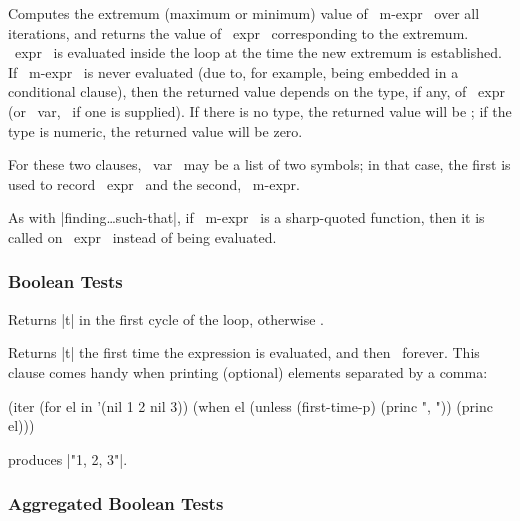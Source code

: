 \begin{clauses}
\startitem
{}
\finishitem
Computes the extremum (maximum or minimum) value of ~m-expr~ over all
iterations, and returns the value of ~expr~ corresponding to the
extremum.  ~expr~ is evaluated inside the loop at the time the new
extremum is established.  If ~m-expr~ is never evaluated (due to, for
example, being embedded in a conditional clause), then the returned
value depends on the type, if any, of ~expr~ (or ~var,~ if
one is supplied).  If there is no type, the returned
value will be \nil; if the type is numeric, the returned value will be
zero.

\cpar For these two clauses, ~var~ may be a list of two
symbols; in that case, the first is used to record ~expr~ and
the second, ~m-expr.~

\cpar As with |finding\dots such-that|, if ~m-expr~ is a sharp-quoted
function, then it is called on ~expr~ instead of being evaluated.

\end{clauses}

\subsubsection{Boolean Tests}

\begin{clauses}

Returns |t| in the first cycle of the loop, otherwise \nil.

Returns |t| the first time the expression is evaluated, and then \nil\ forever.
This clause comes handy when printing (optional) elements separated
by a comma:

\begin{program}
(iter (for el in '(nil 1 2 nil 3))
      (when el
        (unless (first-time-p)
          (princ ", "))
        (princ el)))
\end{program}
produces |"1, 2, 3"|.

\end{clauses}

\subsubsection{Aggregated Boolean Tests}

